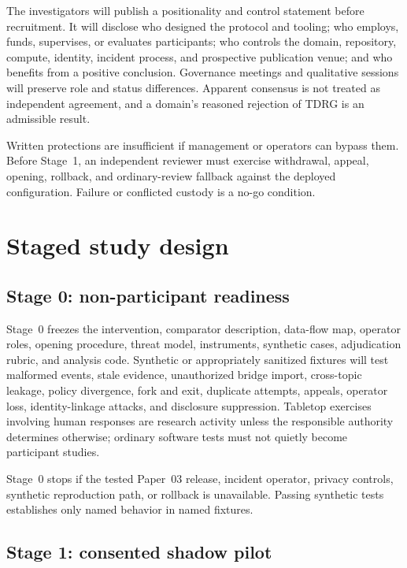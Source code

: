 \documentclass[11pt]{article}
\newcommand{\tdrg}{TDRG}
\begin{document}
The investigators will publish a positionality and control statement before
recruitment. It will disclose who designed the protocol and tooling; who employs,
funds, supervises, or evaluates participants; who controls the domain, repository,
compute, identity, incident process, and prospective publication venue; and who
benefits from a positive conclusion. Governance meetings and qualitative sessions
will preserve role and status differences. Apparent consensus is not treated as
independent agreement, and a domain's reasoned rejection of \tdrg{} is an
admissible result.

\begin{evidencegate}
Written protections are insufficient if management or operators can bypass them.
Before Stage~1, an independent reviewer must exercise withdrawal, appeal, opening,
rollback, and ordinary-review fallback against the deployed configuration. Failure
or conflicted custody is a no-go condition.
\end{evidencegate}

\section{Staged study design}

\subsection{Stage 0: non-participant readiness}

Stage~0 freezes the intervention, comparator description, data-flow map, operator
roles, opening procedure, threat model, instruments, synthetic cases, adjudication
rubric, and analysis code. Synthetic or appropriately sanitized fixtures will test
malformed events, stale evidence, unauthorized bridge import, cross-topic leakage,
policy divergence, fork and exit, duplicate attempts, appeals, operator loss,
identity-linkage attacks, and disclosure suppression. Tabletop exercises involving
human responses are research activity unless the responsible authority determines
otherwise; ordinary software tests must not quietly become participant studies.

Stage~0 stops if the tested Paper~03 release, incident operator, privacy controls,
synthetic reproduction path, or rollback is unavailable. Passing synthetic tests
establishes only named behavior in named fixtures.

\subsection{Stage 1: consented shadow pilot}
\end{document}
